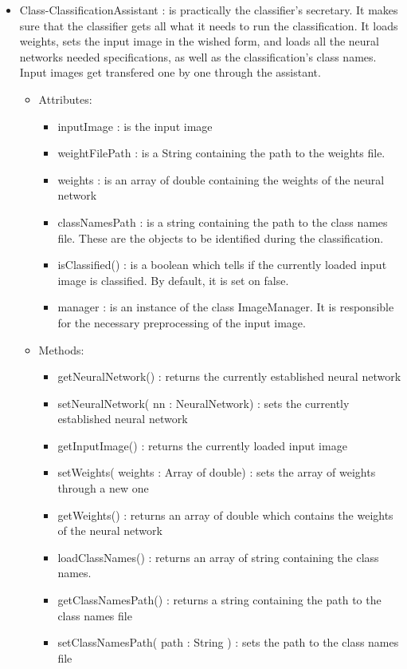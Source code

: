 \documentclass[parskip=full]{scrartcl}
\begin{document}
\begin{itemize}
	\item Class-ClassificationAssistant : is practically the classifier's secretary. It makes sure that the classifier gets all what it needs to run the classification. It loads weights, sets the input image in the wished form, and loads all the neural networks needed specifications, as well as the classification's class names. Input images get transfered one by one through the assistant.
	\begin{itemize}
		\item Attributes:
		\begin{itemize}
			\item inputImage : is the input image
			\item weightFilePath : is a String containing the path to the weights file.
			\item weights : is an array of double containing the weights of the neural network
			\item classNamesPath : is a string containing the path to the class names file. These are the objects to be identified during the classification.
			\item isClassified() : is a boolean which tells if the currently loaded input image is classified. By default, it is set on false.
			\item manager : is an instance of the class ImageManager. It is responsible for the necessary preprocessing of the input image.
		\end{itemize}
		\item Methods:
		\begin{itemize}
			\item getNeuralNetwork() : returns the currently established neural network
			\item setNeuralNetwork( nn : NeuralNetwork) : sets the currently established neural network
			\item getInputImage() : returns the currently loaded input image
			\item setWeights( weights : Array of double) : sets the array of weights through a new one
			\item getWeights() : returns an array of double which contains the weights of the neural network
			\item loadClassNames() : returns an array of string containing the class names.
			\item getClassNamesPath() : returns a string containing the path to the class names file
			\item setClassNamesPath( path : String ) : sets the path to the class names file
		\end{itemize}
	\end{itemize}
\end{itemize}
\end{document}
